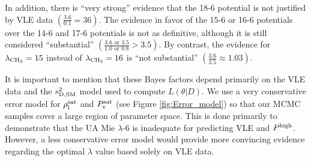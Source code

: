 \documentclass[preprint,letterpaper,floatfix,citeautoscript,aip,jcp]{revtex4-1}
\begin{document}

%



In addition, there is ``very strong'' evidence that the 18-6 potential is not justified by VLE data $\left(\frac{3.6}{0.1} = 36\right)$. The evidence in favor of the 15-6 or 16-6 potentials over the 14-6 and 17-6 potentials is not as definitive, although it is still considered ``substantial'' $\left(\frac{3.6 \text{ or } 3.5}{1.0 \text{ or } 0.8} > 3.5\right)$. By contrast, the evidence for $\lambda_{\rm CH_3} = 15$ instead of $\lambda_{\rm CH_3} = 16$ is ``not substantial'' $\left(\frac{3.6}{3.5} \approx 1.03\right)$.

It is important to mention that these Bayes factors depend primarily on the VLE data and the $s^2_{\rm D,SM}$ model used to compute $L(\theta|D)$. We use a very conservative error model for $\rho_{\rm l}^{\rm sat}$ and $P_{\rm v}^{\rm sat}$ (see Figure \ref{fig:Error_model}) so that our MCMC samples cover a large region of parameter space. This is done primarily to demonstrate that the UA Mie $\lambda$-6 is inadequate for predicting VLE and $P^{\rm high}$. However, a less conservative error model would provide more convincing evidence regarding the optimal $\lambda$ value based solely on VLE data. 
\end{document}
